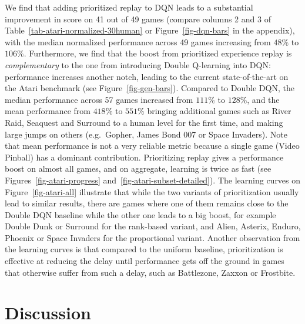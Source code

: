 \documentclass[a4paper]{article}
\begin{document}
We find that adding prioritized replay to DQN leads to a substantial improvement in score on 41 out of 49 games
(compare columns 2 and 3 of Table~\ref{tab-atari-normalized-30human} or Figure~\ref{fig-dqn-bars} in the appendix), 
with the median normalized performance across 49 games increasing from $48\%$ to $106\%$. 
Furthermore, we find that the boost from prioritized experience replay is \emph{complementary} to the one 
from introducing Double Q-learning into DQN: 
performance increases another notch, leading to the current state-of-the-art on the Atari benchmark
(see Figure~\ref{fig-gen-bars}). 
Compared to Double DQN, the median performance across 57 games increased from $111\%$ to $128\%$, and the mean performance from $418\%$ to $551\%$ bringing
additional games such as River Raid, Seaquest and Surround to a human level for the first time, and making large jumps on others (e.g.\ Gopher, James Bond 007 or Space Invaders).
Note that mean performance is not a very reliable metric because a single game (Video Pinball) has a dominant contribution.
Prioritizing replay gives a performance boost on almost all games, 
and on aggregate, learning is twice as fast (see Figures~\ref{fig-atari-progress} and~\ref{fig-atari-subset-detailed}).
The learning curves on Figure~\ref{fig-atari-all} illustrate that while the two variants of prioritization usually lead to similar results,
there are games where one of them remains close to the Double DQN baseline while the other one leads to a big boost,
for example Double Dunk or Surround for the rank-based variant, and Alien, Asterix, Enduro, Phoenix or Space Invaders for the proportional variant.
Another observation from the learning curves is that compared to the uniform baseline, prioritization is effective at reducing the delay until performance gets off the ground in games that otherwise suffer from such a delay, such as Battlezone, Zaxxon or Frostbite. %


\section{Discussion}
\end{document}

